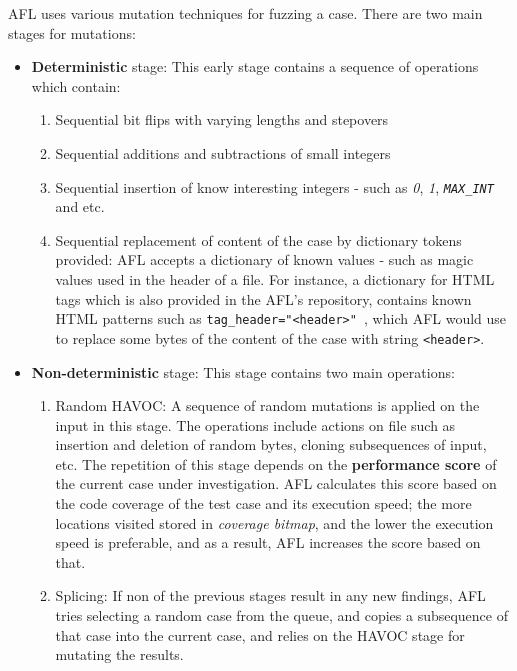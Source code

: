 AFL uses various mutation techniques for fuzzing a case. There are two main stages for mutations:
\begin{itemize}
    \item \textbf{Deterministic} stage: This early stage contains a sequence of operations which contain:
    \begin{enumerate}
        \item Sequential bit flips with varying lengths and stepovers
        \item Sequential additions and subtractions of small integers
        \item Sequential insertion of know interesting integers - such as \textit{0}, \textit{1}, \texttt{\textit{MAX\_INT}} and etc. \cite{about_afl}
        \item Sequential replacement of content of the case by dictionary tokens provided: AFL accepts a dictionary of known values - such as magic values used in the header of a file. For instance, a dictionary for HTML tags which is also provided in the AFL's repository, contains known HTML patterns such as \texttt{tag\_header="<header>"
        }, which AFL would use to replace some bytes of the content of the case with string \texttt{<header>}.
    \end{enumerate}
    
    \item \textbf{Non-deterministic} stage: This stage contains two main operations:
    \begin{enumerate}
        \item Random HAVOC: A sequence of random mutations is applied on the input in this stage. The operations include actions on file such as insertion and deletion of random bytes, cloning subsequences of input, etc. The repetition of this stage depends on the \textbf{performance score} of the current case under investigation. AFL calculates this score based on the code coverage of the test case and its execution speed; the more locations visited stored in \textit{coverage bitmap}, and the lower the execution speed is preferable, and as a result, AFL increases the score based on that. 
        \item Splicing: If non of the previous stages result in any new findings, AFL tries selecting a random case from the queue, and copies a subsequence of that case into the current case, and relies on the HAVOC stage for mutating the results.
    \end{enumerate}
\end{itemize}

